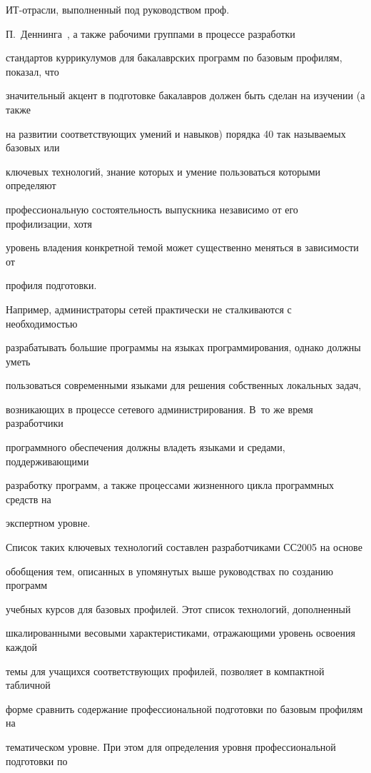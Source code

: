       ИТ-от\-рас\-ли, выполненный под руководством проф.\ 

      П.~Деннинга~\cite{23-s}, а также рабочими группами в процессе разработки 

стандартов куррикулумов для бакалаврских программ по базовым профилям, показал, что 

значительный акцент в подготовке бакалавров должен быть сделан на изучении (а также 

на развитии соответствующих умений и навыков) порядка 40 так называемых базовых или 

ключевых технологий, знание которых и умение пользоваться которыми определяют 

профессиональную состоятельность выпускника независимо от его профилизации, хотя 

уровень владения конкретной темой может существенно меняться в зависимости от 

профиля подготовки.



Например, администраторы сетей практически не сталкиваются с необходимостью 

разрабатывать большие программы на языках программирования, однако должны уметь 

пользоваться современными языками для решения собственных локальных задач, 

возникающих в процессе сетевого администрирования. В~то же время разработчики 

программного обеспечения должны владеть языками и средами, поддерживающими 

разработку программ, а также процессами жизненного цикла программных средств на 

экспертном уровне.



Список таких ключевых технологий составлен разработчиками СС2005 на основе 

обобщения тем, описанных в упомянутых выше руководствах по созданию программ 

учебных курсов для базовых профилей. Этот список технологий, дополненный 

шкалированными весовыми характеристиками, отражающими уровень освоения каждой 

темы для учащихся соответствующих профилей, позволяет в компактной табличной 

форме сравнить содержание профессиональной подготовки по базовым профилям на 

тематическом уровне. При этом для определения уровня профессиональной подготовки по 

